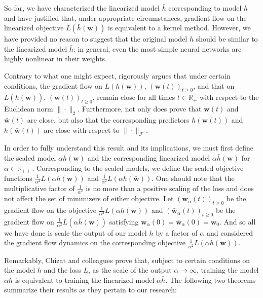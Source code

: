 \documentclass{article}
\begin{document}
So far, we have characterized the linearized model $\bar{h}$ corresponding to model $h$ and have justified that, under appropriate circumstances, gradient flow on the linearized objective $L(\bar{h}(\boldsymbol{w}))$ is equivalent to a kernel method. However, we have provided no reason to suggest that the original model $h$ should be similar to the linearized model $\bar{h}$: in general, even the most simple neural networks are highly nonlinear in their weights. 

Contrary to what one might expect, \cite{chizat2019lazy} rigorously argues that under certain conditions, the gradient flow on $L(h(\boldsymbol{w}))$, $(\boldsymbol{w}(t))_{t \geq 0}$, and that on $L(\bar{h}(\boldsymbol{w}))$, $(\boldsymbol{\bar{w}}(t))_{t \geq 0}$, remain close for all times $t \in \mathbb{R}_+$ with respect to the Euclidean norm $\| \cdot \|_2$. Furthermore, not only does \cite{chizat2019lazy} prove that $\boldsymbol{w}(t)$ and $\boldsymbol{\bar{w}}(t)$ are close, but also that the corresponding predictors $h(\boldsymbol{w}(t))$ and $h(\boldsymbol{\bar{w}}(t))$ are close with respect to $\| \cdot \|_{\mathcal{F}}$.

In order to fully understand this result and its implications, we must first define the scaled model $\alpha h(\boldsymbol{w})$ and the corresponding linearized model $\alpha \bar{h}(\boldsymbol{w})$ for $\alpha \in \mathbb{R}_{++}$. Corresponding to the scaled models, we define the scaled objective functions $\frac{1}{\alpha^2}L(\alpha h(\boldsymbol{w}))$ and $\frac{1}{\alpha^2}L(\alpha h(\boldsymbol{\bar{w}}))$. One should note that the multiplicative factor of $\frac{1}{\alpha^2}$ is no more than a positive scaling of the loss and does not affect the set of minimizers of either objective. Let $(\boldsymbol{w}_{\alpha}(t))_{t \geq 0}$ be the gradient flow on the objective $\frac{1}{\alpha^2}L(\alpha h(\boldsymbol{w}))$ and $(\boldsymbol{\bar{w}}_{\alpha}(t))_{t \geq 0}$ be the gradient flow on $\frac{1}{\alpha^2}L(\alpha \bar{h}(\boldsymbol{w}))$ satisfying $\boldsymbol{w}_{\alpha}(0) = \boldsymbol{\bar{w}}_{\alpha}(0) = \boldsymbol{w}_0$. And so all we have done is scale the output of our model $h$ by a factor of $\alpha$ and considered the gradient flow dynamics on the corresponding objective $\frac{1}{\alpha^2}L(\alpha h(\boldsymbol{w}))$.

Remarkably, Chizat and colleagues prove that, subject to certain conditions on the model $h$ and the loss $L$, as the scale of the output $\alpha \rightarrow \infty$, training the model $\alpha h$ is equivalent to training the linearized model $\alpha \bar{h}$. The following two theorems summarize their results as they pertain to our research:
\end{document}
